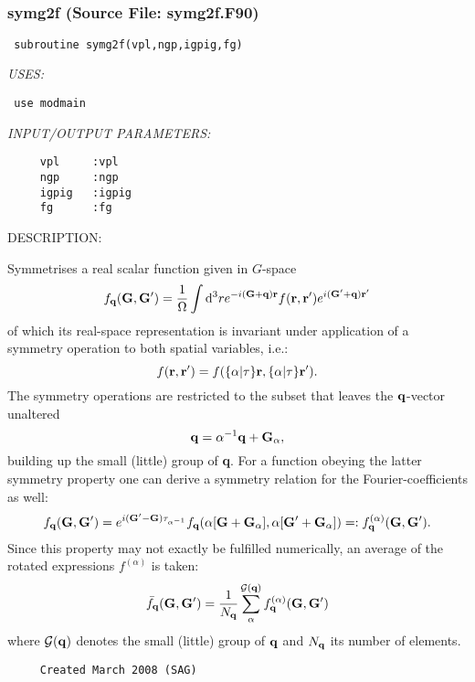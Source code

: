 \documentclass[11pt]{article}
\begin{document}
 
 
\mbox{}\hrulefill\ 
 
\subsubsection{symg2f (Source File: symg2f.F90)}


\begin{verbatim} subroutine symg2f(vpl,ngp,igpig,fg)\end{verbatim}{\em USES:}
\begin{verbatim} use modmain\end{verbatim}{\em INPUT/OUTPUT PARAMETERS:}
\begin{verbatim}     vpl     :vpl
     ngp     :ngp
     igpig   :igpig
     fg      :fg\end{verbatim}
{\sf DESCRIPTION:\\ }


     Symmetrises a real scalar function given in $G$-space
     $$ f_{\bf q}({\bf G},{\bf G'}) = \frac{1}{\Omega}\int {\rm d}^3r 
     e^{-i{\bf (G+q)r}} f({\bf r},{\bf r'}) e^{i{\bf (G'}+{\bf q}){\bf r'}} $$
     of which its real-space representation is invariant under application of
     a symmetry  operation to both spatial variables, i.e.:
     $$ f({\bf r},{\bf r'}) = f(\{\alpha|\tau\}{\bf r},\{\alpha|\tau\}{\bf r'}).
     $$
     The symmetry operations are restricted to the subset that leaves the
     ${\bf q}$-vector unaltered
     $$ {\bf q}=\alpha^{-1}{\bf q} + {\bf G}_{\alpha},  $$
     building up the small (little) group of {\bf q}.
     For a function obeying the latter symmetry property one can derive a
     symmetry relation for the Fourier-coefficients as well:
     $$ f_{\bf q}({\bf G},{\bf G'}) =  
     e^{i({\bf G'}-{\bf G})\tau_{\alpha^{-1}}} 
     f_{\bf q}(\alpha[{\bf G}+{\bf G}_{\alpha}],
     \alpha[{\bf G'}+{\bf G}_{\alpha}]) =: f^{(\alpha)}_{\bf q}({\bf G},
     {\bf G'}).$$
     Since this property may not exactly be fulfilled numerically, an average
     of the rotated expressions $f^{(\alpha)}$ is taken:
     $$  \bar{f}_{\bf q}({\bf G},{\bf G'})= \frac{1}{N_{\bf q}}
     \sum_{\alpha}^{\mathcal{G}({\bf q})}
     f^{(\alpha)}_{\bf q}({\bf G},{\bf G'}) $$
     where $\mathcal{G}({\bf q})$ denotes the small (little) group of ${\bf q}$
     and $N_{\bf q}$ its number of elements.
  
\begin{verbatim}     Created March 2008 (SAG)\end{verbatim}
\end{document}
